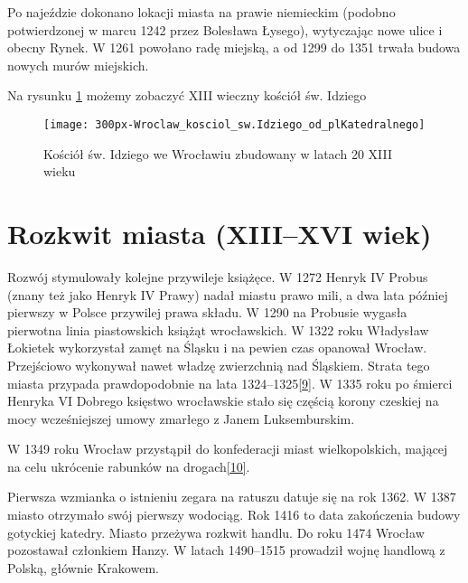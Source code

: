 \documentclass{article}
\begin{document}
\vspace{6pt}

\noindent Po najeździe dokonano lokacji miasta na prawie niemieckim (podobno potwierdzonej w marcu 1242 przez Bolesława Łysego), wytyczając nowe ulice i obecny Rynek. W 1261 powołano radę miejską, a od 1299 do 1351 trwała budowa nowych murów miejskich.

\vspace{6pt}

\noindent Na rysunku \ref{rysunek2} możemy zobaczyć XIII wieczny kościół św. Idziego

\begin{figure}[h]
\centering
\texttt{[image: 300px-Wroclaw\_kosciol\_sw.Idziego\_od\_plKatedralnego]}
\caption{Kościół św. Idziego we Wrocławiu zbudowany w latach 20 XIII wieku}
\label{rysunek2}
\end{figure}

\section*{Rozkwit miasta (XIII–XVI wiek)}
Rozwój stymulowały kolejne przywileje książęce. W 1272 Henryk IV Probus (znany też jako Henryk IV Prawy) nadał miastu prawo mili, a dwa lata później pierwszy w Polsce przywilej prawa składu. W 1290 na Probusie wygasła pierwotna linia piastowskich książąt wrocławskich. W 1322 roku Władysław Łokietek wykorzystał zamęt na Śląsku i na pewien czas opanował Wrocław. Przejściowo wykonywał nawet władzę zwierzchnią nad Śląskiem. Strata tego miasta przypada prawdopodobnie na lata 1324–1325\hyperref[9]{[9]}\label{19}. W 1335 roku po śmierci Henryka VI Dobrego księstwo wrocławskie stało się częścią korony czeskiej na mocy wcześniejszej umowy zmarłego z Janem Luksemburskim.

\vspace{6pt}

\noindent W 1349 roku Wrocław przystąpił do konfederacji miast wielkopolskich, mającej na celu ukrócenie rabunków na drogach\hyperref[10]{[10]}\label{110}.

\vspace{6pt}

\noindent Pierwsza wzmianka o istnieniu zegara na ratuszu datuje się na rok 1362. W 1387 miasto otrzymało swój pierwszy wodociąg. Rok 1416 to data zakończenia budowy gotyckiej katedry. Miasto przeżywa rozkwit handlu. Do roku 1474 Wrocław pozostawał członkiem Hanzy. W latach 1490–1515 prowadził wojnę handlową z Polską, głównie Krakowem.
\end{document}
